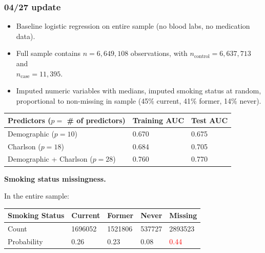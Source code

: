 \documentclass[12pt]{article}
\newcommand{\note}[1]{\textcolor{red}{#1}}
\begin{document}
\pagebreak

\subsubsection*{04/27 update}

\begin{itemize}
  \item Baseline logistic regression on entire sample (no blood labs, no medication data).
  \item Full sample contains $n = 6,649,108$ observations, with $n_{\text{control}} = 6,637,713$ and \\ $n_{\text{case}} = 11,395$.
  \item Imputed numeric variables with medians, imputed smoking status at random, proportional to non-missing in sample (45\% current, 41\% former, 14\% never).
\end{itemize}

\begin{center}
\begin{tabular}{|l|l|l|}
\hline
\textbf{Predictors ($p=$ \# of predictors)}                                                & \textbf{Training AUC} & \textbf{Test AUC} \\ \hline
Demographic ($p=10$)                                     & 0.670                & 0.675            \\ \hline
Charlson ($p=18$) & 0.684 & 0.705                                                          \\ \hline
Demographic + Charlson ($p=28$)                                                 & 0.760               & 0.770     \\ \hline
\end{tabular}
\end{center}
{\bf Smoking status missingness.}

In the entire sample:
\begin{center}
\begin{tabular}{|l|l|l|l|l|}
\hline
\textbf{Smoking Status} & Current & Former & Never & Missing \\ \hline
Count & 1696052 & 1521806 & 537727 & 2893523 \\ \hline
Probability & 0.26 & 0.23 & 0.08 & \note{0.44} \\ \hline
\end{tabular}
\end{center}
\end{document}
